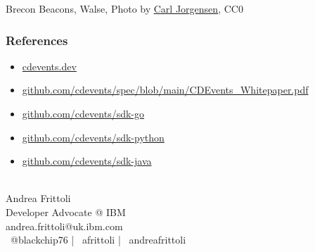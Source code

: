 \documentclass[aspectratio=169,11pt,hyperref={colorlinks=true}]{beamer}
\begin{document}
\begin{sectionwithpiclargecentral}{Brecon Beacons, Walse, Photo by \href{https://unsplash.com/@scamartist}{\underline{Carl Jorgensen}}, CC0}
\end{sectionwithpiclargecentral}

\begin{blackframe}
  \frametitle{References}
  \begin{itemize}
    \item \href{https://cdevents.dev}{cdevents.dev}
    \item \href{https://github.com/cdevents/spec/blob/main/CDEvents_Whitepaper.pdf}{github.com/cdevents/spec/blob/main/CDEvents\_Whitepaper.pdf}
    \item \href{https://github.com/cdevents/sdk-go}{github.com/cdevents/sdk-go}
    \item \href{https://github.com/cdevents/sdk-python}{github.com/cdevents/sdk-python}
    \item \href{https://github.com/cdevents/sdk-java}{github.com/cdevents/sdk-java}
  \end{itemize}
  ~ \\
  Andrea Frittoli \\
  Developer Advocate @ IBM\\
  andrea.frittoli@uk.ibm.com \\
  \faTwitter ~@blackchip76 | \faGithub ~afrittoli | \faLinkedin ~andreafrittoli
\end{blackframe}
\end{document}
